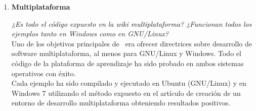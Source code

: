 \begin{enumerate}
    \item \textbf{Multiplataforma}
    
    \textit{¿Es todo el código expuesto en la wiki multiplataforma?
    ¿Funcionan todos los ejemplos tanto en Windows como en GNU/Linux?}\\
    
    Uno de los objetivos principales de \wiki\ era ofrecer directrices
    sobre desarrollo de software multiplataforma, al menos para GNU/Linux
    y Windows. Todo el código de la plataforma de aprendizaje ha sido
    probado en ambos sistemas operativos con éxito.\\
    
    Cada ejemplo ha sido compilado y ejecutado en Ubuntu (GNU/Linux) y
    en Windows 7 utilizando el método expuesto en el artículo
    de creación de un entorno de desarrollo multiplataforma \cite{website:multiplataforma}
    obteniendo resultados positivos.\\
    
\end{enumerate}
